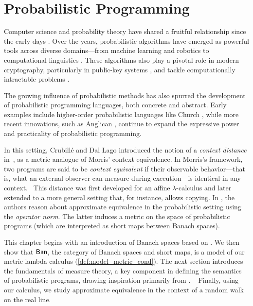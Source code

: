 \chapter{Probabilistic Programming} \label{ch:pp}


Computer science and probability theory have shared a fruitful relationship since the early days \cite{de1956computability}. Over the years, probabilistic algorithms have emerged as powerful tools across diverse domains—from machine learning \cite{pearl2014} and robotics \cite{thrun2002robotic} to computational linguistics \cite{manning1999foundations}. These algorithms also play a pivotal role in modern cryptography, particularly in public-key systems \cite{goldwasserProbabilisticEncryption1984}, and tackle computationally intractable problems \cite{motwaniRandomizedAlgorithms1995}.

The growing influence of probabilistic methods has also spurred the development of probabilistic programming languages, both concrete and abstract. Early examples include higher-order probabilistic languages like Church \cite{Church2008}, while more recent innovations, such as Anglican \cite{Anglican2015}, continue to expand the expressive power and practicality of probabilistic programming.


In this setting, Crubillé and Dal Lago introduced the notion of a \emph{context distance} in~\cite{crubilleMetricReasoningLterms2015,crubilleMetricReasoninglambda2017}, as a metric analogue of Morris' context equivalence. In Morris's framework, two programs are said to be \emph{context equivalent} if their observable behavior---that is, 
what an external observer can measure during execution---is identical in any context.  This distance was first developed for an affine $\lambda$-calculus and later extended to a more general 
setting that, for instance, allows copying.
%
In \cite{dahlqvist2023syntactic}, the authors reason about approximate equivalence in the probabilistic setting using the \emph{operator norm}. The latter induces a metric on the space of probabilistic programs (which are interpreted as short maps between Banach spaces).

This chapter begins with an introduction of Banach spaces based on \cite{rudin91functional,InfiniteDimensionalAnalysis2006, ryanIntroductionTensorProducts2013}. We then show that $\mathsf{Ban}$, the category of Banach spaces and short maps, is a model of our metric lambda calculus (\autoref{def:model_metric_cond}). The next section introduces the fundamentals of measure theory, a key component in defining the semantics of probabilistic programs, drawing inspiration primarily from \cite{dahlqvistSemanticsProbabilisticProgramming2020a, bogachevMeasureTheory2007,InfiniteDimensionalAnalysis2006}.  
Finally, using our calculus, we study approximate equivalence in the context of a random walk on the real line.



